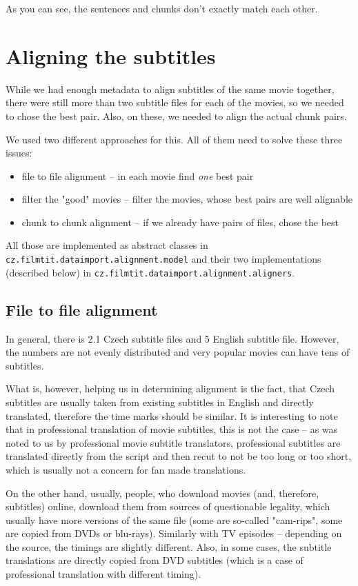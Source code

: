As you can see, the sentences and chunks don't exactly match each other.

\section{Aligning the subtitles}
\label{sec:aligning_subtitles}

While we had enough metadata to align subtitles of the same movie together, there were still more than two subtitle files for each of the movies, so we needed to chose the best pair. Also, on these, we needed to align the actual chunk pairs.

We used two different approaches for this. All of them need to solve these three issues:
\begin{itemize}
    \item file to file alignment -- in each movie find \emph{one} best pair
    \item filter the "good" movies -- filter the movies, whose best pairs are well alignable
    \item chunk to chunk alignment -- if we already have pairs of files, chose the best  
\end{itemize}

All those are implemented as abstract classes in \texttt{cz.filmtit.dataimport.alignment.model} and their two implementations (described below) in \texttt{cz.filmtit.dataimport.alignment.aligners}.

\subsection{File to file alignment}
In general, there is 2.1 Czech subtitle files and 5 English subtitle file. However, the numbers are not evenly distributed and very popular movies can have tens of subtitles.

What is, however, helping us in determining alignment is the fact, that Czech subtitles are usually taken from existing subtitles in English and directly translated, therefore the time marks should be similar. It is interesting to note that in professional translation of movie subtitles, this is not the case -- as was noted to us by professional movie subtitle translators, professional subtitles are translated directly from the script and then recut to not be too long or too short, which is usually not a concern for fan made translations. 

On the other hand, usually, people, who download movies (and, therefore, subtitles) online, download them from sources of questionable legality, which usually have more versions of the same file (some are so-called "cam-rips", some are copied from DVDs or blu-rays). Similarly with TV episodes -- depending on the source, the timings are slightly different. Also, in some cases, the subtitle translations are directly copied from DVD subtitles (which is a case of professional translation with different timing).

